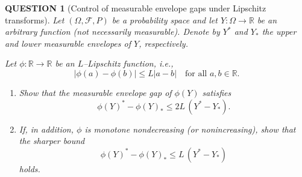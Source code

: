 \documentclass[12pt]{article}
\renewcommand{\(}{\left(}%
\renewcommand{\)}{\right)}%
\renewcommand{\[}{\left[}%
\renewcommand{\]}{\right]}%
\newtheorem{question}{QUESTION}[section]}
\begin{document}
\begin{question}[Control of measurable envelope gaps under Lipschitz transforms]
Let $(\Omega,\mathcal{F},P)$ be a probability space and let $Y:\Omega\to\mathbb{R}$ be an arbitrary function (not necessarily measurable).
Denote by $Y^*$ and $Y_*$ the upper and lower measurable envelopes of $Y$, respectively.

Let $\phi:\mathbb{R}\to\mathbb{R}$ be an $L$--Lipschitz function, i.e.,
\begin{equation*}
|\phi(a)-\phi(b)| \le L |a-b| \quad \text{for all } a,b\in\mathbb{R}.
\end{equation*}

\begin{enumerate}
\item[(i)] Show that the measurable envelope gap of $\phi(Y)$ satisfies
\begin{equation*}
\phi(Y)^* - \phi(Y)_* \le 2L\,(Y^*-Y_*).
\end{equation*}

\item[(ii)] If, in addition, $\phi$ is monotone nondecreasing (or nonincreasing), show that the sharper bound
\begin{equation*}
\phi(Y)^* - \phi(Y)_* \le L\,(Y^*-Y_*)
\end{equation*}
holds.
\end{enumerate}
\end{question}
\end{document}
